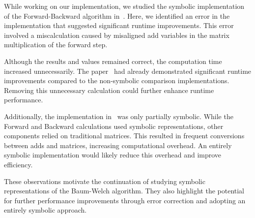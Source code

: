 While working on our implementation, we studied the symbolic implementation of the Forward-Backward algorithm in~\cite{p7}. 
Here, we identified an error in the implementation that suggested significant runtime improvements. 
This error involved a miscalculation caused by misaligned \gls{add} variables in the matrix multiplication of the forward step.

Although the results and values remained correct, the computation time increased unnecessarily. 
The paper~\cite{p7} had already demonstrated significant runtime improvements compared to the non-symbolic comparison implementations. 
Removing this unnecessary calculation could further enhance runtime performance.

Additionally, the implementation in~\cite{p7} was only partially symbolic. While the Forward and Backward calculations used symbolic representations, other components relied on traditional matrices. 
This resulted in frequent conversions between \glspl{add} and matrices, increasing computational overhead. 
An entirely symbolic implementation would likely reduce this overhead and improve efficiency.

These observations motivate the continuation of studying symbolic representations of the Baum-Welch algorithm. 
They also highlight the potential for further performance improvements through error correction and adopting an entirely symbolic approach.

